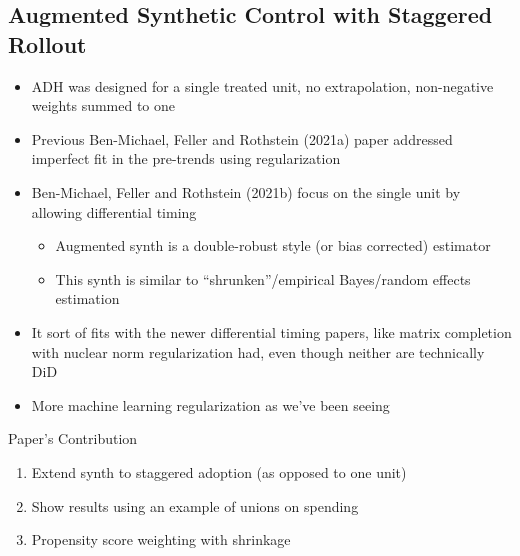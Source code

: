 \documentclass{beamer}
\begin{document}
\subsection{Augmented Synthetic Control with Staggered Rollout}

\begin{frame}

\begin{itemize}
\item ADH was designed for a single treated unit, no extrapolation, non-negative weights summed to one
\item Previous Ben-Michael, Feller and Rothstein (2021a) paper addressed imperfect fit in the pre-trends using regularization
\item Ben-Michael, Feller and Rothstein (2021b) focus on the single unit by allowing differential timing
	\begin{itemize}
	\item Augmented synth is a double-robust style (or bias corrected) estimator
	\item This synth is similar to ``shrunken''/empirical Bayes/random effects estimation
	\end{itemize}
\item It sort of fits with the newer differential timing papers, like matrix completion with nuclear norm regularization had, even though neither are technically DiD
\item More machine learning regularization as we've been seeing
\end{itemize}

\end{frame}

\begin{frame}{Paper's Contribution}

\begin{enumerate}
	\item Extend synth to staggered adoption (as opposed to one unit)
	\item Show results using an example of unions on spending
	\item Propensity score weighting with shrinkage
\end{enumerate}

\end{frame}
\end{document}

